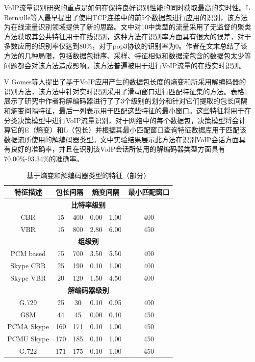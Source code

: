 VoIP流量识别研究的重点是如何在保持良好识别性能的同时获取最高的实时性。L Bernaille等人最早提出了使用TCP连接中的前5个数据包进行应用的识别\supercite{voipmethod1}，该方法为在线流量识别领域提供了新的思路。文中对10中类型的流量采用了无监督的聚类方法获取其公共特征用于在线识别，这种方法在识别率方面具有很大的误差，对于多数应用的识别率仅达到80\%，对于pop3协议的识别率为0。作者在文末总结了该方法的几种局限，包括数据包排序、采样、特征相似和数据流包含的数据包太少等问题都会对该方法造成影响。该方法普遍被用于进行VoIP流量的在线实时识别。

V Gomes等人提出了基于VoIP应用产生的数据包长度的熵变和所采用解编码器的识别方法\supercite{4}，该方法中针对实时识别采用了滑动窗口进行匹配特征集的方法。表格\ref{tab:entropycodec}展示了研究中作者将解编码器进行了了3个级别的划分和针对它们提取的包长间隔和熵变间隔特征，最后一列表示用于匹配这些特征的最小窗口。这些特征将用于在分类决策模型中进行VoIP流量识别，对于网络中的每个数据包，决策模型将会计算它的E（熵变）和L（包长）并根据其最小匹配窗口查询特征数据库用于匹配该数据流所使用的解编码器类型。文中实验结果展示此方法在识别VoIP会话方面具有良好的准确率，并且在识别该VoIP会话所使用的解编码器类型方面具有70.00\%-93.34\%的准确率。



\begin{table} [thb]
\caption{基于熵变和解编码器类型的特征（部分）}\label{tab:entropycodec}
\small
\centering
\begin{tabular}{cccccc}
  \hline
        \textbf{特征描述} & \multicolumn{2}{c}{\textbf{包长间隔}} & \multicolumn{2}{c}{\textbf{熵变间隔}} &  \textbf{最小匹配窗口} \\
  \hline
  \multicolumn{6}{c}{\scriptsize \textbf{比特率级别}}\\
        CBR & 15 & 400 & 0.00 & 1.00 & 400 \\
        VBR & 15 & 800 & 2.80 & 6.00 & 450 \\
\multicolumn{6}{c}{\scriptsize \textbf{组级别}}\\
PCM based & 75 & 700 & 3.50 & 5.50 & 400 \\
Skype CBR & 25 & 190 & 0.10 & 1.00 & 400 \\
Skype VBR & 20 & 120 & 1.50 & 4.50 & 400 \\
\multicolumn{6}{c}{\scriptsize \textbf{解编码器级别}}\\
G.729 & 25 & 30 & 0.10 & 0.95 & 400 \\
GSM & 44 & 45 & 0.00 & 0.10 & 450 \\
PCMA Skype& 160 & 171 & 0.10 & 1.00 & 450 \\
PCMU Skype& 170 & 185 & 0.10 & 1.00 & 450 \\
G.722& 171 & 175 & 0.10 & 1.00 & 450 \\
 \hline
\end{tabular}
\end{table}

